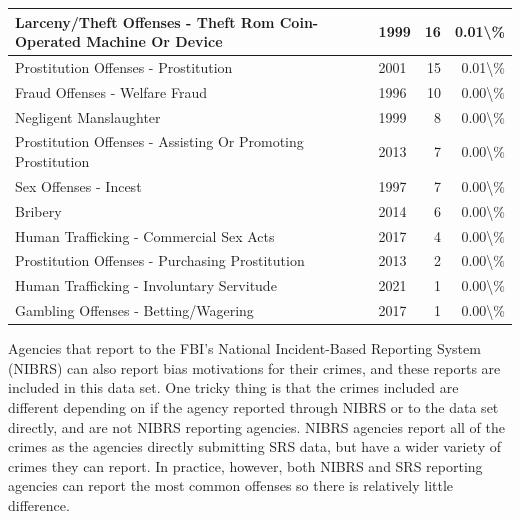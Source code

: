 \documentclass[
]{krantz}
\begin{document}
\begin{longtable}[t]{l|l|r|r}
\hline
Larceny/Theft Offenses - Theft Rom Coin-Operated Machine Or Device & 1999 & 16 & 0.01\textbackslash{}\%\\
\hline
Prostitution Offenses - Prostitution & 2001 & 15 & 0.01\textbackslash{}\%\\
\hline
Fraud Offenses - Welfare Fraud & 1996 & 10 & 0.00\textbackslash{}\%\\
\hline
Negligent Manslaughter & 1999 & 8 & 0.00\textbackslash{}\%\\
\hline
Prostitution Offenses - Assisting Or Promoting Prostitution & 2013 & 7 & 0.00\textbackslash{}\%\\
\hline
Sex Offenses - Incest & 1997 & 7 & 0.00\textbackslash{}\%\\
\hline
Bribery & 2014 & 6 & 0.00\textbackslash{}\%\\
\hline
Human Trafficking - Commercial Sex Acts & 2017 & 4 & 0.00\textbackslash{}\%\\
\hline
Prostitution Offenses - Purchasing Prostitution & 2013 & 2 & 0.00\textbackslash{}\%\\
\hline
Human Trafficking - Involuntary Servitude & 2021 & 1 & 0.00\textbackslash{}\%\\
\hline
Gambling Offenses - Betting/Wagering & 2017 & 1 & 0.00\textbackslash{}\%\\
\hline
\end{longtable}

Agencies that report to the FBI's National Incident-Based
Reporting System (NIBRS) can also report bias motivations
for their crimes, and these reports are included in this
data set. One tricky thing is that the crimes included are
different depending on if the agency reported through NIBRS
or to the data set directly, and are not NIBRS reporting
agencies. NIBRS agencies report all of the crimes as the
agencies directly submitting SRS data, but have a wider
variety of crimes they can report. In practice, however,
both NIBRS and SRS reporting agencies can report the most
common offenses so there is relatively little difference.
\end{document}
